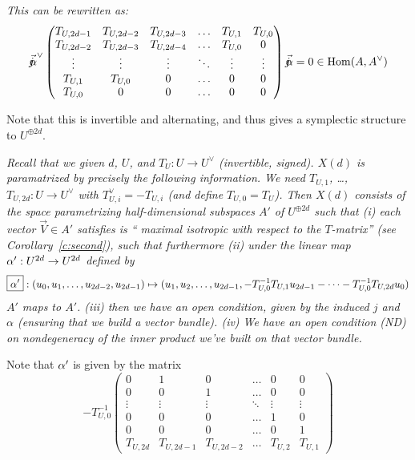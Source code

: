 { \label{c:second}
{\em This can be rewritten as:
  $$
 \vec{\mathord{j\mkern-7mu\alpha}}^\vee
 \begin{pmatrix}
T_{U,2d-1} & T_{U,2d-2} &  T_{U,2d-3} &  \hdots & T_{U,1} & T_{U,0} \\
 T_{U,2d-2} &  T_{U,2d-3} & T_{U,2d-4} &  \hdots & T_{U,0} & 0 \\
   \vdots  & \vdots  &   \vdots  & \ddots & \vdots & \vdots \\
   T_{U,1} & T_{U,0} & 0 & \hdots & 0 & 0 \\
   T_{U,0} & 0 & 0 & \hdots & 0 & 0 
  \end{pmatrix}
 \vec{\mathord{j\mkern-7mu\alpha}} =0 \in \operatorname{Hom}(A,A^\vee)
$$
}

Note that this  is invertible and alternating, and thus gives a symplectic structure to $U^{\oplus 2d}$.


  \label{t:preliminaryform}{\em Recall that we given $d$, $U$, and $T_U: U \rightarrow U^\vee$ (invertible, signed).
  $X(d)$ is paramatrized by precisely the following information.
 We need $T_{U,1}$, \dots, $T_{U,2d}: U \rightarrow U^\vee$ with $T_{U,i}^\vee = - T_{U,i}$ (and define $T_{U,0}=T_U$). Then $X(d)$ consists of the space parametrizing half-dimensional subspaces $\boxed{A'}$ of $U^{\oplus 2d}$ such that (i) each vector $\vec{V} \in A'$ satisfies is `` maximal isotropic with respect to the $T$-matrix'' 
 (see Corollary~\ref{c:second}), such that furthermore
(ii)  under the linear map $\alpha' : U^{2d} \rightarrow U^{2d}$ defined by  $$\boxed{\alpha'}: (u_0, u_1, \dots, u_{2d-2}, u_{2d-1}) \mapsto
 (u_1, u_2, \dots, u_{2d-1},
 -T^{-1}_{U,0} T_{U,1} u_{2d-1}  - \cdots  -T^{-1}_{U,0} T_{U,2d} u_0 )$$
 $A'$ maps to $A'$.  (iii) then we have an open condition, given by the induced $j$ and $\alpha$ (ensuring that we build a vector bundle). (iv)  We have an open condition (ND) on nondegeneracy of the inner product we've built on that vector bundle.
}

Note that $\alpha'$ is given by the matrix
$$ -T^{-1}_{U,0}
\begin{pmatrix}
  0 & 1  & 0 & \hdots &       0 &  0 \\
  0 & 0 &  1 & \hdots &       0 &  0 \\
\vdots & \vdots & \vdots & \ddots & \vdots & \vdots \\
  0 & 0 &  0 & \hdots &       1 &  0 \\
  0 & 0 &  0 & \hdots &       0 &  1 \\
 T_{U,2d} & T_{U,2d-1} & T_{U,2d-2} & \hdots & T_{U,2} & T_{U,1} 
  \end{pmatrix}
$$

}
